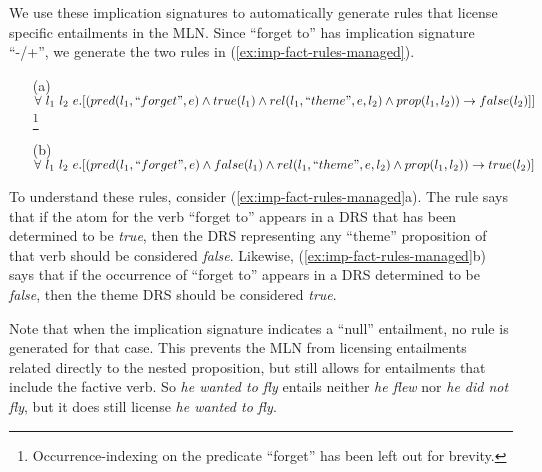 We use these implication signatures to automatically generate rules that
license specific entailments in the MLN.  Since ``forget to'' has implication
signature ``-/+'', we generate the two rules in 
(\ref{ex:imp-fact-rules-managed}).

\begin{small}
\begin{example}\label{ex:imp-fact-rules-managed}
\begin{itemize}
   \item[(a)] $\forall~l_1~l_2~e.[(pred(l_1,``forget",e) \land true(l_1) \land rel(l_1,``theme",e,l_2) \land prop(l_1,l_2)) \rightarrow false(l_2)]]$\footnote{Occurrence-indexing on the predicate ``forget'' has been left out for brevity.}
   \item[(b)] $\forall~l_1~l_2~e.[(pred(l_1,``forget",e) \land false(l_1) \land rel(l_1,``theme",e,l_2) \land prop(l_1,l_2)) \rightarrow true(l_2)]$
\end{itemize}
\end{example}
\end{small}

To understand these rules, consider (\ref{ex:imp-fact-rules-managed}a).  The rule
says that if the atom for the verb ``forget to'' appears in a DRS that has been
determined to be {\it true}, then the DRS representing any ``theme'' proposition
of that verb should be considered {\it false}.  Likewise,
(\ref{ex:imp-fact-rules-managed}b) says that if the occurrence of ``forget to''
appears in a DRS determined to be {\it false}, then the theme DRS should be
considered {\it true}.

Note that when the implication signature indicates a ``null'' entailment, no
rule is generated for that case.  This prevents the MLN from licensing
entailments related directly to the nested proposition, but still allows for
entailments that include the factive verb.  So {\it he wanted to fly} entails
neither {\it he flew} nor {\it he did not fly}, but it does still license {\it
he wanted to fly}.  




